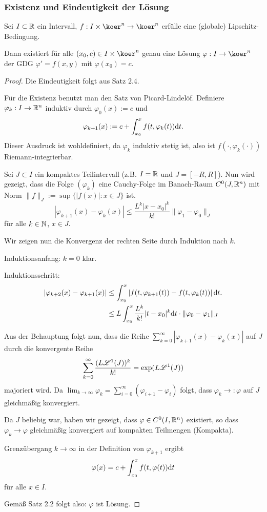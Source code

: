 \subsubsection{Existenz und Eindeutigkeit der Lösung}
 \begin{lem}
  Sei $I \subset \mathbb{R}$ ein  Intervall, $f: I \times \koer^n \to \koer^n$
  erfülle eine (globale) Lipschitz-Bedingung.

  Dann existiert für alle $(x_0,c) \in I \times \koer^n$ genau eine Lösung
  $\varphi:I \to \koer^n$ der GDG $\varphi'=f(x,y)$ mit $\varphi(x_0) = c$.
 \end{lem}

 \begin{proof}
  Die Eindeutigkeit folgt aus Satz 2.4.
  
  Für die Existenz benutzt man den Satz von Picard-Lindelöf. Definiere $\varphi_k: I \to \mathbb{R}^n$ induktiv durch $\varphi_0(x) := c$ und 
  \[ \varphi_{k+1}(x) := c + \int_{x_0}^x f(t, \varphi_k(t)) \mathrm{d} t. \]
  Dieser Ausdruck ist wohldefiniert, da $\varphi_k$ induktiv stetig ist, also ist $f( \cdot, \varphi_k(\cdot) )$ Riemann-integrierbar.
  
  Sei $J \subset I$ ein kompaktes Teilintervall (z.B. $I = \mathbb{R}$ und $J = [-R,R]$). Nun wird gezeigt, dass die Folge $(\varphi_k)$ eine Cauchy-Folge im Banach-Raum $C^0(J,\mathbb{R}^n)$ mit Norm $\| f \|_J := \sup \{ |f(x)| : x \in J \}$ ist.
  \[ | \varphi_{k+1}(x) - \varphi_k(x) | \le \frac{L^k | x - x_0 |^k}{k!} \| \varphi_1 - \varphi_0 \|_J \]
  für alle $k \in \mathbb{N}$, $x \in J$.
  
  Wir zeigen nun die Konvergenz der rechten Seite durch Induktion nach $k$.
  
  Induktionsanfang: $k=0$ klar.
  
  Induktionsschritt:
  \[ \begin{aligned}
     | \varphi_{k+2}(x) - \varphi_{k+1}(x) | 
     &\le \int_{x_0}^x \left| f(t, \varphi_{k+1}(t) ) - f(t, \varphi_k(t)) \right| \mathrm{d} t. \\
     &\le L \int_{x_0}^x \frac{L^k}{k!} |t-x_0|^k \mathrm{d} t \cdot \|\varphi_0 - \varphi_1\|_J  
     \end{aligned} \]
     
  Aus der Behauptung folgt nun, dass die Reihe $\sum_{k=0}^\infty | \varphi_{k+1}(x) - \varphi_k(x)|$ auf $J$ durch die konvergente Reihe
  \[ \sum_{k=0}^\infty \frac{(L \mathscr{L}^1(J))^k}{k!} = \exp( L \mathscr{L}^1(J) ) \]
  majoriert wird. Da $\lim_{k \to \infty} \varphi_k = \sum_{i=0}^\infty (\varphi_{i+1} - \varphi_i)$ folgt, dass $\varphi_k \to: \varphi$ auf $J$ gleichmäßig konvergiert.
  
  Da $J$ beliebig war, haben wir gezeigt, dass $\varphi \in C^0(I, \mathbb{R}^n)$ existiert, so dass $\varphi_k \to \varphi$ gleichmäßig konvergiert auf kompakten Teilmengen (Kompakta).
  
  Grenzübergang $k \to \infty$ in der Definition von $\varphi_{k+1}$ ergibt
  \[ \varphi(x) = c + \int_{x_0}^x f(t, \varphi(t) ) \mathrm{d} t \]
  für alle $x \in I$.
  
  Gemäß Satz 2.2 folgt also: $\varphi$ ist Lösung.
 \end{proof}

